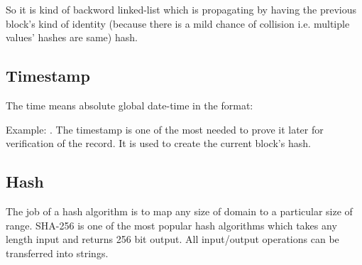 
So it is kind of backword linked-list which is propagating by having the previous block's kind of identity (because there is a mild chance of collision i.e. multiple values' hashes are same) hash.

\subsection{Timestamp}
The time means absolute global date-time in the format: 


Example: \textbf{}. The timestamp is one of the most needed to prove it later for verification of the record. It is used to create the current block's hash.

\subsection{Hash}
The job of a hash algorithm is to map any size of domain to a particular size of range. SHA-256 is one of the most popular hash algorithms which takes any length input and returns 256 bit output. All input/output operations can be transferred into strings.

